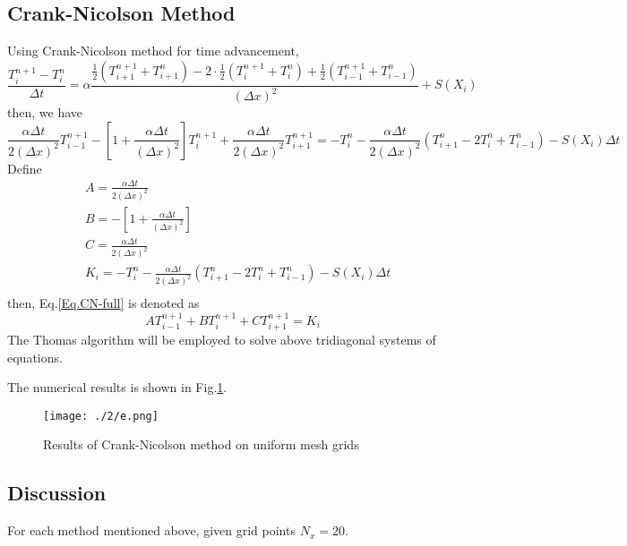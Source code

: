 \documentclass[12pt,a4paper]{article} %
\begin{document}
\begin{CJK}{UTF8}{song}
\subsection{Crank-Nicolson Method}
Using Crank-Nicolson method for time advancement,
\begin{equation}
\frac{T_{i}^{n+1}-T_{i}^{n}}{\Delta t}=\alpha
\frac{{\frac{1}{2}(T_{i+1}^{n+1}+T_{i+1}^{n})-2\cdot \frac{1}{2}(T_{i}^{n+1}+T_{i}^{n})}+\frac{1}{2}(T_{i-1}^{n+1}+T_{i-1}^{n})}
{(\Delta x)^{2}}+S(X_{i})
\end{equation}
then, we have
\begin{equation}
\frac{\alpha \Delta t}{2(\Delta x)^{2}}T_{i-1}^{n+1}-[1+\frac{\alpha \Delta t}{(\Delta x)^{2}}]T_{i}^{n+1}+\frac{\alpha \Delta t}{2(\Delta x)^{2}}T_{i+1}^{n+1}=
-T_{i}^{n}-\frac{\alpha \Delta t}{2(\Delta x)^{2}}(T_{i+1}^{n}-2T_{i}^{n}+T_{i-1}^{n})-S(X_{i})\Delta t \label{Eq.CN-full}
\end{equation}
Define
\begin{equation}
    \begin{split}
& A = \frac{\alpha \Delta t}{2(\Delta x)^{2}} \\
& B = -[1+\frac{\alpha \Delta t}{(\Delta x)^{2}}] \\
& C = \frac{\alpha \Delta t}{2(\Delta x)^{2}} \\
& K_{i} = -T_{i}^{n}-\frac{\alpha \Delta t}{2(\Delta x)^{2}}(T_{i+1}^{n}-2T_{i}^{n}+T_{i-1}^{n})-S(X_{i})\Delta t \\
    \end{split}
\end{equation}
then, Eq.\ref{Eq.CN-full} is denoted as
\begin{equation}
AT_{i-1}^{n+1}+BT_{i}^{n+1}+CT_{i+1}^{n+1} = K_{i}
\end{equation}
The Thomas algorithm will be employed to solve above tridiagonal systems of equations.

The numerical results is shown in Fig.\ref{Fig.2-e}.
\begin{figure}[htbp]
\centering
{
    \texttt{[image: ./2/e.png]}
}
\caption{Results of Crank-Nicolson method on uniform mesh grids} \label{Fig.2-e}
\end{figure}


\subsection{Discussion}

For each method mentioned above, given grid points $N_{x}=20$.


\end{CJK}
\end{document}

